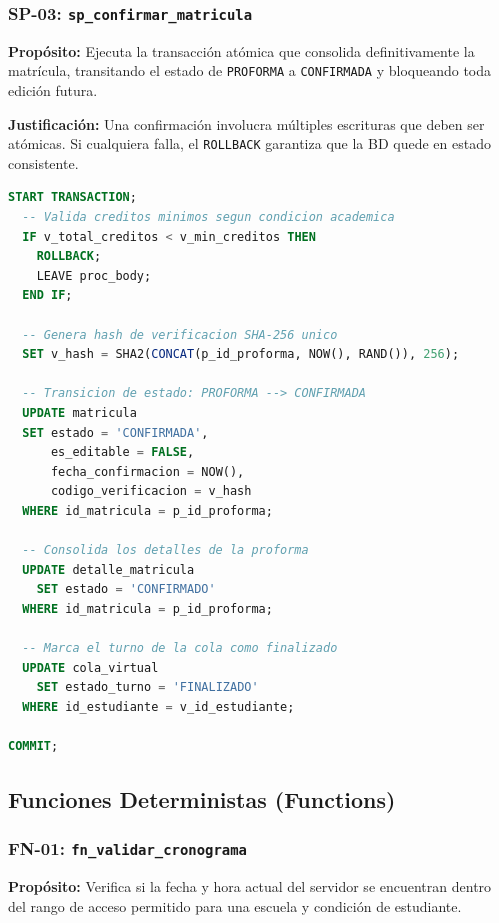 \documentclass[12pt,a4paper]{article}
\begin{document}
\subsubsection{SP-03: \texttt{sp\_confirmar\_matricula}}

\textbf{Prop\'osito:} Ejecuta la transacci\'on at\'omica que consolida definitivamente la matr\'icula, transitando el estado de \texttt{PROFORMA} a \texttt{CONFIRMADA} y bloqueando toda edici\'on futura.

\textbf{Justificaci\'on:} Una confirmaci\'on involucra m\'ultiples escrituras que deben ser at\'omicas. Si cualquiera falla, el \texttt{ROLLBACK} garantiza que la BD quede en estado consistente.

\begin{lstlisting}[language=SQL, caption={Logica central de sp\_confirmar\_matricula}]
START TRANSACTION;
  -- Valida creditos minimos segun condicion academica
  IF v_total_creditos < v_min_creditos THEN
    ROLLBACK;
    LEAVE proc_body;
  END IF;

  -- Genera hash de verificacion SHA-256 unico
  SET v_hash = SHA2(CONCAT(p_id_proforma, NOW(), RAND()), 256);

  -- Transicion de estado: PROFORMA --> CONFIRMADA
  UPDATE matricula
  SET estado = 'CONFIRMADA',
      es_editable = FALSE,
      fecha_confirmacion = NOW(),
      codigo_verificacion = v_hash
  WHERE id_matricula = p_id_proforma;

  -- Consolida los detalles de la proforma
  UPDATE detalle_matricula
    SET estado = 'CONFIRMADO'
  WHERE id_matricula = p_id_proforma;

  -- Marca el turno de la cola como finalizado
  UPDATE cola_virtual
    SET estado_turno = 'FINALIZADO'
  WHERE id_estudiante = v_id_estudiante;

COMMIT;
\end{lstlisting}

\subsection{Funciones Deterministas (Functions)}

\subsubsection{FN-01: \texttt{fn\_validar\_cronograma}}

\textbf{Prop\'osito:} Verifica si la fecha y hora actual del servidor se encuentran dentro del rango de acceso permitido para una escuela y condici\'on de estudiante.
\end{document}
